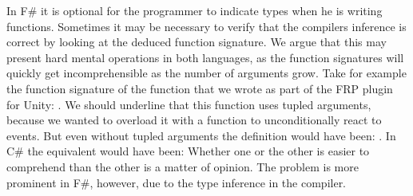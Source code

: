 In F\# it is optional for the programmer to indicate types when he is writing functions. Sometimes it may be necessary to verify that the compilers inference is correct by looking at the deduced function signature. We argue that this may present hard mental operations in both languages, as the function signatures will quickly get incomprehensible as the number of arguments grow. Take for example the function signature of the  function that we wrote as part of the \gls{FRP} plugin for Unity:
\newline
{}.\newline
We should underline that this function uses tupled arguments, because we wanted to overload it with a function to unconditionally react to events. But even without tupled arguments the definition would have been:\newline
{}.\newline
In C\# the equivalent would have been:\newline
{}\newline
Whether one or the other is easier to comprehend than the other is a matter of opinion. The problem is more prominent in F\#, however, due to the type inference in the compiler.
